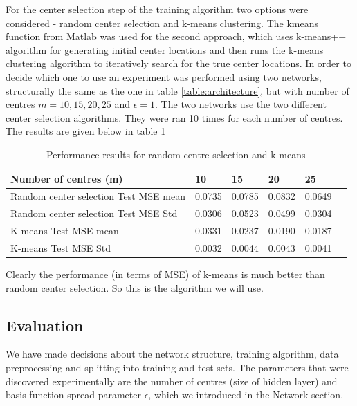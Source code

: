 \documentclass[a4paper, 11pt]{article}
\begin{document}
For the center selection step of the training algorithm two options were considered - random center selection and k-means clustering. The kmeans function from Matlab was used for the second approach, which uses k-means++ algorithm \cite{Arthur2007} for generating initial center locations and then runs the k-means clustering algorithm \cite{Lloyd82} to iteratively search for the true center locations. In order to decide which one to use an experiment was performed using two networks, structurally the same as the one in table \ref{table:architecture}, but with number of centres $m = 10, 15, 20, 25$ and $\epsilon = 1$. The two networks use the two different center selection algorithms. They were ran 10 times for each number of centres. The results are given below in table \ref{table:centermse}

\begin{table}[h]
\centering
\begin{tabular}{| l | l | l | l | l | l |}
\hline
Number of centres (m) & 10 & 15 & 20 & 25 \\
\hline
Random center selection Test MSE mean & 0.0735 & 0.0785 & 0.0832 & 0.0649 \\
\hline
Random center selection Test MSE Std & 0.0306 & 0.0523 & 0.0499 & 0.0304 \\
\hline
K-means Test MSE mean & 0.0331 & 0.0237 & 0.0190 & 0.0187 \\
\hline
K-means Test MSE Std & 0.0032 & 0.0044 & 0.0043 & 0.0041 \\
\hline
\end{tabular}
\caption{Performance results for random centre selection and k-means}
\label{table:centermse}
\end{table}

Clearly the performance (in terms of MSE) of k-means is much better than random center selection. So this is the algorithm we will use.

\subsection{Evaluation}
We have made decisions about the network structure, training algorithm, data preprocessing and splitting into training and test sets. The parameters that were discovered experimentally are the number of centres (size of hidden layer) and basis function spread parameter $\epsilon$, which we introduced in the Network section.
\end{document}
